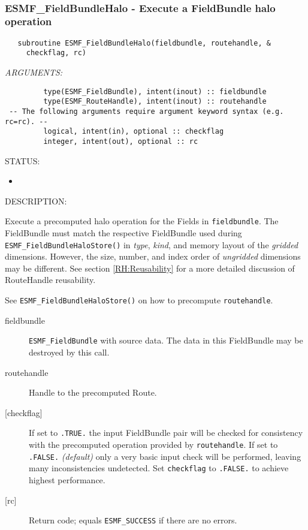  
\mbox{}\hrulefill\ 
 
\subsubsection [ESMF\_FieldBundleHalo] {ESMF\_FieldBundleHalo - Execute a FieldBundle halo operation}


  
\begin{verbatim}   subroutine ESMF_FieldBundleHalo(fieldbundle, routehandle, &
     checkflag, rc)\end{verbatim}{\em ARGUMENTS:}
\begin{verbatim}         type(ESMF_FieldBundle), intent(inout) :: fieldbundle
         type(ESMF_RouteHandle), intent(inout) :: routehandle
 -- The following arguments require argument keyword syntax (e.g. rc=rc). --
         logical, intent(in), optional :: checkflag
         integer, intent(out), optional :: rc\end{verbatim}
{\sf STATUS:}
   \begin{itemize}
   \item{}
   \end{itemize}
  
{\sf DESCRIPTION:\\ }


   \begin{sloppypar}
   Execute a precomputed halo operation for the Fields in {\tt fieldbundle}.
   The FieldBundle must match the respective FieldBundle used during
   {\tt ESMF\_FieldBundleHaloStore()} in {\em type}, {\em kind}, and
   memory layout of the {\em gridded} dimensions. However, the size, number,
   and index order of {\em ungridded} dimensions may be different. See section
   \ref{RH:Reusability} for a more detailed discussion of RouteHandle
   reusability.
   \end{sloppypar}
  
   See {\tt ESMF\_FieldBundleHaloStore()} on how to precompute
   {\tt routehandle}.
  
   \begin{description}
   \item [fieldbundle]
   {\tt ESMF\_FieldBundle} with source data. The data in this
   FieldBundle may be destroyed by this call.
   \item [routehandle]
   Handle to the precomputed Route.
   \item [{[checkflag]}]
   If set to {\tt .TRUE.} the input FieldBundle pair will be checked for
   consistency with the precomputed operation provided by {\tt routehandle}.
   If set to {\tt .FALSE.} {\em (default)} only a very basic input check
   will be performed, leaving many inconsistencies undetected. Set
   {\tt checkflag} to {\tt .FALSE.} to achieve highest performance.
   \item [{[rc]}]
   Return code; equals {\tt ESMF\_SUCCESS} if there are no errors.
   \end{description}
   
